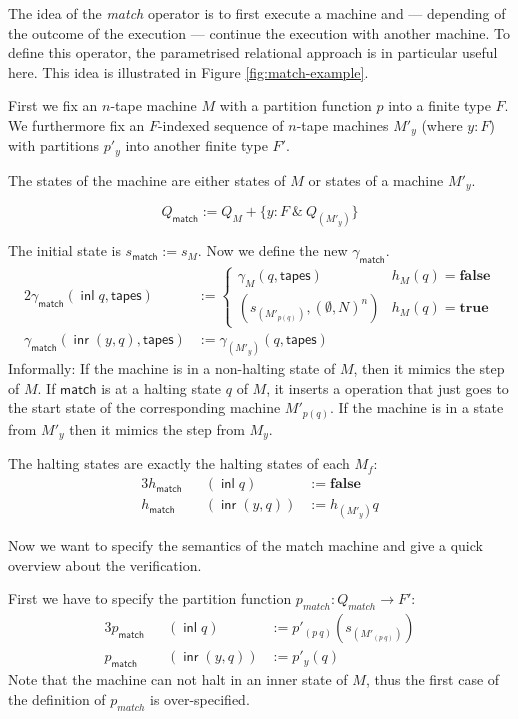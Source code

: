 \documentclass{psartcl}
\newcommand{\MS}[1]{\textsf{#1}}
\newcommand{\from}{:}
\renewcommand{\to}{\rightarrow}
\renewcommand{\None}{\emptyset}
\newcommand{\true}{\mathbf{true}}
\newcommand{\false}{\mathbf{false}}
\DeclareMathOperator{\inl}{\ensuremath{\MS{inl}}}
\DeclareMathOperator{\inr}{\ensuremath{\MS{inr}}}
\begin{document}
The idea of the \emph{match} operator is to first execute a machine and --- depending of the outcome of the execution --- continue the execution with
another machine.  To define this operator, the parametrised relational approach is in particular useful here.  This idea is illustrated in Figure
\ref{fig:match-example}.

First we fix an $n$-tape machine $M$ with a partition function $p$ into a finite type $F$.
We furthermore fix an $F$-indexed sequence of $n$-tape machines $M'_y$ (where $y:F$) with partitions $p'_y$ into another finite type $F'$.

The states of the machine are either states of $M$ or states of a machine $M'_y$.

$$Q_{\MS{match}} := Q_M + \{ y:F ~\&~ Q_{ \left( M'_{y} \right) } \}$$

The initial state is $s_{\MS{match}} := s_M$.  Now we define the new $\gamma_{\MS{match}}$.
\begin{alignat*}{2}
  \gamma_{\MS{match}} (\inl q, \MS{tapes}) &:=
  \begin{cases}
    \gamma_{M}(q, \MS{tapes})                                & h_M(q) = \false \\
    \left( s_{\left(M'_{p(q)}\right)}, (\None, N)^n \right)  & h_M(q) = \true
  \end{cases} \\
  \gamma_{\MS{match}} (\inr (y, q), \MS{tapes}) &:= \gamma_{\left({M'_y}\right)}(q, \MS{tapes})
\end{alignat*}
Informally:  If the machine is in a non-halting state of $M$, then it mimics the step of $M$.  If $\MS{match}$ is at a halting state $q$ of $M$, it
inserts a operation that just goes to the start state of the corresponding machine $M'_{p(q)}$.  If the machine is in a state from $M'_y$ then it
mimics the step from $M_y$.

The halting states are exactly the halting states of each $M_f$:
\begin{alignat*}{3}
  h_{\MS{match}} && (\inl      q) &:= \false \\
  h_{\MS{match}} && (\inr (y, q)) &:= h_{\left( M'_y \right)}q
\end{alignat*}

Now we want to specify the semantics of the match machine and give a quick overview about the verification.

First we have to specify the partition function $p_{match} \from Q_{match} \to F'$:
\begin{alignat*}{3}
  p_{\MS{match}} && (\inl      q) &:= p'_{\left({p~q}\right)} \left( s_{ \left( M'_{ \left( p~q \right) } \right) } \right) \\
  p_{\MS{match}} && (\inr (y, q)) &:= p'_y(q)
\end{alignat*}
Note that the machine can not halt in an inner state of $M$, thus the first case of the definition of $p_{match}$ is over-specified.
\end{document}
